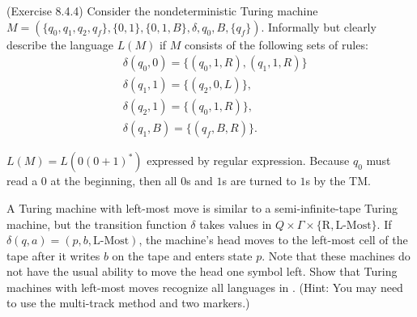 \documentclass[10pt]{homework}
\begin{document}
\begin{problem} (Exercise 8.4.4) Consider the nondeterministic Turing machine
  \(M = (\{q_0, q_1, q_2, q_f\}, \{0, 1\}, \{0, 1, B\}, \delta, q_0, B, \{q_f\})\).
  Informally but clearly describe the language \(L(M)\) if \(M\) consists of the
  following sets of rules:
  \begin{align*}
    & \delta(q_{0}, 0) = \{(q_{0}, 1, R), (q_{1}, 1, R)\}\\
    & \delta(q_{1}, 1) = \{(q_{2}, 0, L)\},\\
    & \delta(q_{2}, 1) = \{(q_{0}, 1, R)\},\\
    & \delta(q_{1}, B) = \{(q_{f}, B, R)\}.
  \end{align*}
\end{problem}

\begin{solution}
    $L\left( M \right) =L\left( 0\left( 0+1 \right)^{*} \right) $ expressed by regular expression. Because $q_0$ must read a $0$ at the beginning, then all $0$s and $1$s are turned to $1$s by the TM.
\end{solution}

\begin{problem}
  A Turing machine with left-most move is similar to a semi-infinite-tape Turing
  machine, but the transition function $\delta$ takes values in
  $Q \times \Gamma \times \{\text{R}, \text{L-Most}\}$.
  If $\delta(q, a) = (p, b, \text{L-Most})$, the machine's head moves to the
  left-most cell of the tape after it writes $b$ on the tape and enters state
  $p$.
  Note that these machines do not have the usual ability to move the head one
  symbol left.
  Show that Turing machines with left-most moves recognize all languages in
  .
  (Hint: You may need to use the multi-track method and two markers.)
\end{problem}
\end{document}
